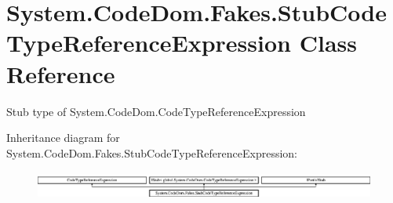\hypertarget{class_system_1_1_code_dom_1_1_fakes_1_1_stub_code_type_reference_expression}{\section{System.\-Code\-Dom.\-Fakes.\-Stub\-Code\-Type\-Reference\-Expression Class Reference}
\label{class_system_1_1_code_dom_1_1_fakes_1_1_stub_code_type_reference_expression}
}


Stub type of System.\-Code\-Dom.\-Code\-Type\-Reference\-Expression 


Inheritance diagram for System.\-Code\-Dom.\-Fakes.\-Stub\-Code\-Type\-Reference\-Expression\-:\begin{figure}[H]
\begin{center}
\leavevmode
\includegraphics[height=0.952381cm]{class_system_1_1_code_dom_1_1_fakes_1_1_stub_code_type_reference_expression}
\end{center}
\end{figure}
